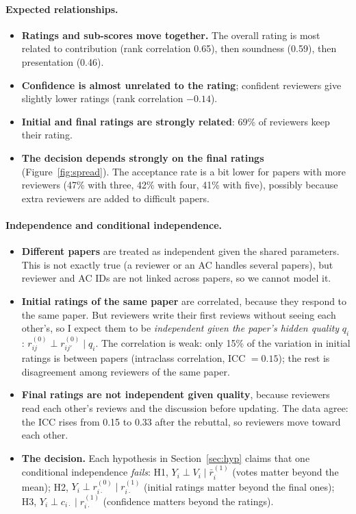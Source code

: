 \documentclass[11pt]{article}
\begin{document}
\paragraph{Expected relationships.}
\begin{itemize}
\item \textbf{Ratings and sub-scores move together.} The overall rating is most related to contribution (rank correlation 0.65), then soundness (0.59), then presentation (0.46).
\item \textbf{Confidence is almost unrelated to the rating}; confident reviewers give slightly lower ratings (rank correlation $-0.14$).
\item \textbf{Initial and final ratings are strongly related}: 69\% of reviewers keep their rating.
\item \textbf{The decision depends strongly on the final ratings} (Figure~\ref{fig:spread}). The acceptance rate is a bit lower for papers with more reviewers (47\% with three, 42\% with four, 41\% with five), possibly because extra reviewers are added to difficult papers.
\end{itemize}

\paragraph{Independence and conditional independence.}
\begin{itemize}
\item \textbf{Different papers} are treated as independent given the shared parameters. This is not exactly true (a reviewer or an AC handles several papers), but reviewer and AC IDs are not linked across papers, so we cannot model it.
\item \textbf{Initial ratings of the same paper} are correlated, because they respond to the same paper. But reviewers write their first reviews without seeing each other's, so I expect them to be \emph{independent given the paper's hidden quality} $q_i$: $r^{(0)}_{ij}\perp r^{(0)}_{ij'}\mid q_i$. The correlation is weak: only 15\% of the variation in initial ratings is between papers (intraclass correlation, ICC $=0.15$); the rest is disagreement among reviewers of the same paper.
\item \textbf{Final ratings are not independent given quality}, because reviewers read each other's reviews and the discussion before updating. The data agree: the ICC rises from 0.15 to 0.33 after the rebuttal, so reviewers move toward each other.
\item \textbf{The decision.} Each hypothesis in Section~\ref{sec:hyp} claims that one conditional independence \emph{fails}: H1, $Y_i\perp V_i\mid \bar r^{(1)}_i$ (votes matter beyond the mean); H2, $Y_i\perp r^{(0)}_{i\cdot}\mid r^{(1)}_{i\cdot}$ (initial ratings matter beyond the final ones); H3, $Y_i\perp c_{i\cdot}\mid r^{(1)}_{i\cdot}$ (confidence matters beyond the ratings).
\end{itemize}
\end{document}
